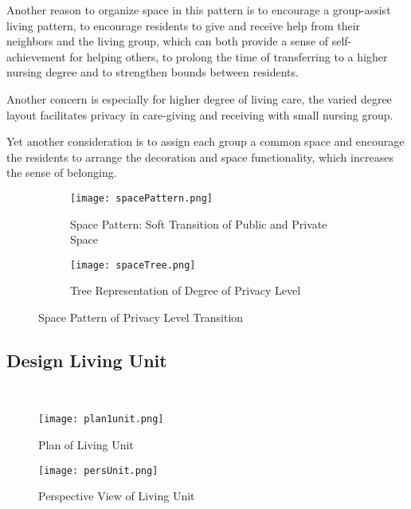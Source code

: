 Another reason to organize space in this pattern is to encourage a
group-assist living pattern, to encourage residents to give and
receive help from their neighbors and the living group, which can both
provide a sense of self-achievement for helping others, to prolong
the time of transferring to a higher nursing degree and to strengthen
bounds between residents.

Another concern is especially for higher degree of living care, the
varied degree layout facilitates privacy in care-giving and
receiving with small nursing group.

Yet another consideration is to assign each group a common space and
encourage the residents to arrange the decoration and space
functionality, which increases the sense of belonging.
\begin{figure}
\centering
\begin{subfigure}{0.7\textwidth}
  \centering
  \texttt{[image: spacePattern.png]}
  \caption{Space Pattern: Soft Transition of Public and Private Space}
  \label{fig:spacePattern}
\end{subfigure}
\begin{subfigure}{0.7\textwidth}
  \centering
  \texttt{[image: spaceTree.png]}
  \caption{Tree Representation of Degree of Privacy Level}
  \label{fig:spaceTree}
\end{subfigure}
\caption{Space Pattern of Privacy Level Transition}
\label{fig:spacePrivacy}
\end{figure}
\subsection{Design Living Unit}~
\begin{figure}[htbp]
	\centering
		\texttt{[image: plan1unit.png]}
	\caption[Plan of Living Unit]{Plan of Living Unit}
	\label{fig:plan1unit}
\end{figure}
\begin{figure}[htbp]
	\centering
		\texttt{[image: persUnit.png]}
	\caption[Perspective View of Living Unit]{Perspective View of Living Unit}
	\label{fig:persUnit}
\end{figure}

